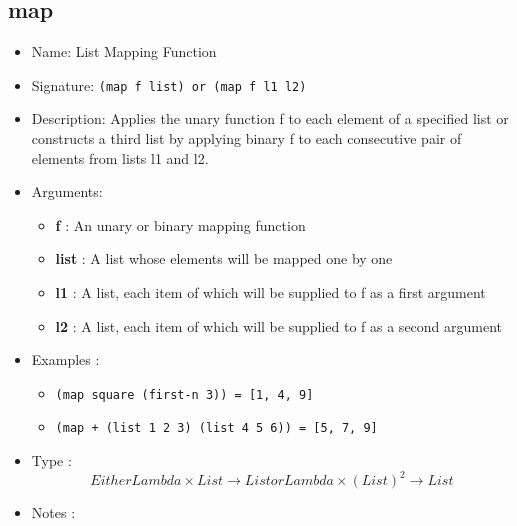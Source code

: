\subsection{map}
\begin{itemize}
    \item Name: List Mapping Function
    \item Signature: \texttt{(map f list) or (map f l1 l2)}
    \item Description: Applies the unary function f to each element of a specified list or constructs a third list by applying binary f to each consecutive pair of elements from lists l1 and l2.
    \item Arguments:
        \begin{itemize}
            \item \textbf{f} : An unary or binary mapping function
            \item \textbf{list} : A list whose elements will be mapped one by one
            \item \textbf{l1} : A list, each item of which will be supplied to f as a first argument
            \item \textbf{l2} : A list, each item of which will be supplied to f as a second argument
        \end{itemize}
    \item Examples :
        \begin{itemize}
            \item \texttt{(map square (first-n 3)) = [1, 4, 9]}
            \item \texttt{(map + (list 1 2 3) (list 4 5 6)) = [5, 7, 9]}
        \end{itemize}
    \item Type : \[Either Lambda \times List \to List or Lambda \times (List)^2 \to List\]
    \item Notes :
\end{itemize}

